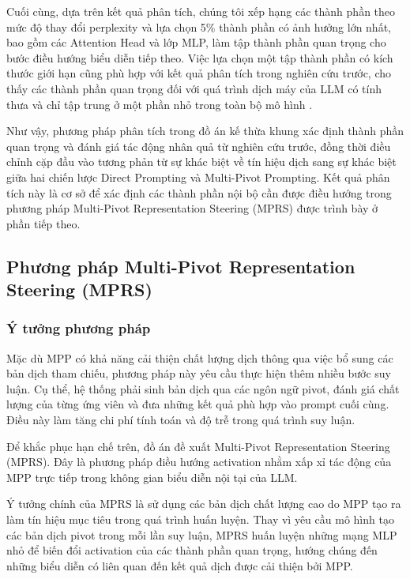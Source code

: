 Cuối cùng, dựa trên kết quả phân tích, chúng tôi xếp hạng các thành phần theo mức độ thay đổi perplexity và lựa chọn 5\% thành phần có ảnh hưởng lớn nhất, bao gồm các Attention Head và lớp MLP, làm tập thành phần quan trọng cho bước điều hướng biểu diễn tiếp theo. Việc lựa chọn một tập thành phần có kích thước giới hạn cũng phù hợp với kết quả phân tích trong nghiên cứu trước, cho thấy các thành phần quan trọng đối với quá trình dịch máy của LLM có tính thưa và chỉ tập trung ở một phần nhỏ trong toàn bộ mô hình \cite{zhang2026exploring}.

Như vậy, phương pháp phân tích trong đồ án kế thừa khung xác định thành phần quan trọng và đánh giá tác động nhân quả từ nghiên cứu trước, đồng thời điều chỉnh cặp đầu vào tương phản từ sự khác biệt về tín hiệu dịch sang sự khác biệt giữa hai chiến lược Direct Prompting và Multi-Pivot Prompting. Kết quả phân tích này là cơ sở để xác định các thành phần nội bộ cần được điều hướng trong phương pháp Multi-Pivot Representation Steering (MPRS) được trình bày ở phần tiếp theo.


\subsection{Phương pháp Multi-Pivot Representation Steering (MPRS)}

\subsubsection*{Ý tưởng phương pháp}

Mặc dù MPP có khả năng cải thiện chất lượng dịch thông qua việc bổ sung các bản dịch tham chiếu, phương pháp này yêu cầu thực hiện thêm nhiều bước suy luận. Cụ thể, hệ thống phải sinh bản dịch qua các ngôn ngữ pivot, đánh giá chất lượng của từng ứng viên và đưa những kết quả phù hợp vào prompt cuối cùng. Điều này làm tăng chi phí tính toán và độ trễ trong quá trình suy luận.

Để khắc phục hạn chế trên, đồ án đề xuất Multi-Pivot Representation Steering (MPRS). Đây là phương pháp điều hướng activation nhằm xấp xỉ tác động của MPP trực tiếp trong không gian biểu diễn nội tại của LLM.

Ý tưởng chính của MPRS là sử dụng các bản dịch chất lượng cao do MPP tạo ra làm tín hiệu mục tiêu trong quá trình huấn luyện. Thay vì yêu cầu mô hình tạo các bản dịch pivot trong mỗi lần suy luận, MPRS huấn luyện những mạng MLP nhỏ để biến đổi activation của các thành phần quan trọng, hướng chúng đến những biểu diễn có liên quan đến kết quả dịch được cải thiện bởi MPP.

